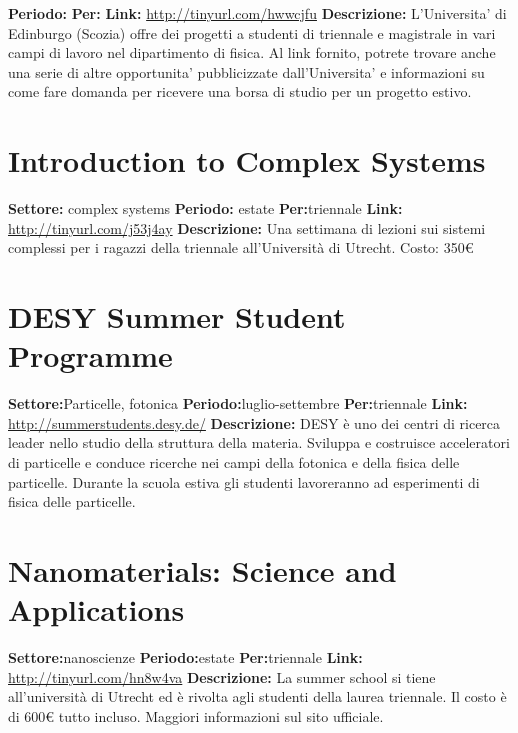 \documentclass[a4paper,10pt]{article}
\begin{document}
\textbf{Periodo:} \newline
\textbf{Per:}\newline
\textbf{Link:} \url{http://tinyurl.com/hwwcjfu} \newline
\textbf{Descrizione:}  L'Universita' di Edinburgo (Scozia) offre dei progetti a studenti di triennale e magistrale in vari campi di lavoro nel dipartimento di fisica. Al link fornito, potrete trovare anche una serie di altre opportunita' pubblicizzate dall'Universita' e informazioni su come fare domanda per ricevere una borsa di studio per un progetto estivo. 	

\section{	Introduction to Complex Systems	}
\textbf{Settore:} complex systems\newline
\textbf{Periodo:} estate\newline
\textbf{Per:}triennale\newline
\textbf{Link:} \url{http://tinyurl.com/j53j4ay} \newline
\textbf{Descrizione:} Una settimana di lezioni sui sistemi complessi per i ragazzi della triennale all'Università di Utrecht. Costo: 350€	

\section{	DESY Summer Student Programme}
\textbf{Settore:}Particelle, fotonica\newline
\textbf{Periodo:}luglio-settembre \newline
\textbf{Per:}triennale\newline
\textbf{Link:} \url{http://summerstudents.desy.de/} \newline
\textbf{Descrizione:}  DESY è uno dei centri di ricerca leader nello studio della struttura della materia. Sviluppa e costruisce acceleratori di particelle e conduce ricerche nei campi della fotonica e della fisica delle particelle. Durante la scuola estiva gli studenti lavoreranno ad esperimenti di fisica delle particelle.

\section{	Nanomaterials: Science and Applications	}
\textbf{Settore:}nanoscienze \newline
\textbf{Periodo:}estate \newline
\textbf{Per:}triennale\newline
\textbf{Link:} \url{http://tinyurl.com/hn8w4va} \newline
\textbf{Descrizione:}  	La summer school si tiene all'università di Utrecht ed è rivolta agli studenti della laurea triennale. Il costo è di 600€ tutto incluso. Maggiori informazioni sul sito ufficiale.	
\end{document}
